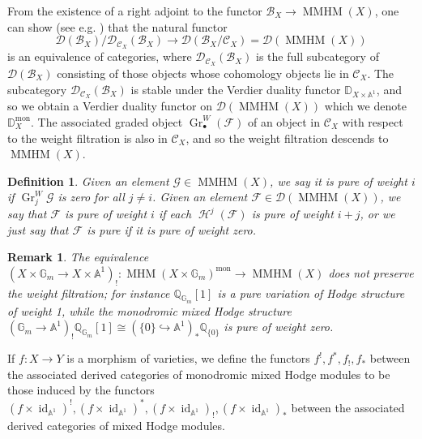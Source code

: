 \documentclass[a4paper,10pt]{amsart}
\newtheorem{definition}[theorem]{Definition}
\newtheorem{proposition}[theorem]{Proposition}
\newtheorem{remark}[theorem]{Remark}
\renewcommand{\AA}{\mathbb{A}}
\newcommand{\DD}{\mathbb{D}}
\newcommand{\GG}{\mathbb{G}}
\newcommand{\GrW}[1]{\Gr^W_{#1}}
\DeclareMathOperator{\Hom}{Hom}
\DeclareMathOperator{\mon}{mon}
\DeclareMathOperator{\MMHM}{MMHM}
\DeclareMathOperator{\Gr}{Gr}
\DeclareMathOperator{\MHM}{MHM}
\DeclareMathOperator{\id}{id}
\DeclareMathOperator{\Ho}{\mathcal{H}}
\newcommand{\Dub}{\mathcal{D}}
\begin{document}

From the existence of a right adjoint to the functor $\mathcal{B}_X\rightarrow \MMHM(X)$, one can show (see e.g. \cite[06XM]{Stackproject}) that the natural functor
\[
\Dub(\mathcal{B}_X)/\Dub_{\mathcal{C}_X}(\mathcal{B}_X)\rightarrow \Dub(\mathcal{B}_X/\mathcal{C}_X)=\Dub(\MMHM(X))
\]
is an equivalence of categories, where $\Dub_{\mathcal{C}_X}(\mathcal{B}_X)$ is the full subcategory of $\Dub(\mathcal{B}_X)$ consisting of those objects whose cohomology objects lie in $\mathcal{C}_X$.  The subcategory $\Dub_{\mathcal{C}_X}(\mathcal{B}_X)$ is stable under the Verdier duality functor $\DD_{X\times\AA^1}$, and so we obtain a Verdier duality functor on $\Dub(\MMHM(X))$ which we denote $\DD^{\mon}_X$.  The associated graded object $\GrW{\bullet}(\mathcal{F})$ of an object in $\mathcal{C}_X$ with respect to the weight filtration is also in $\mathcal{C}_X$, and so the weight filtration descends to $\MMHM(X)$.  
\begin{definition}
Given an element $\mathcal{G}\in\MMHM(X)$, we say it is pure of weight $i$ if $\GrW{j}\mathcal{G}$ is zero for all $j\neq i$.  Given an element $\mathcal{F}\in\Dub(\MMHM(X))$, we say that $\mathcal{F}$ is pure of weight $i$ if each $\Ho^j(\mathcal{F})$ is pure of weight $i+j$, or we just say that $\mathcal{F}$ is \textit{pure} if it is pure of weight zero.
\end{definition}
\begin{remark}
The equivalence $(X\times\GG_m\rightarrow X\times\AA^1)_!\colon \MHM(X\times\GG_m)^{\mon}\rightarrow\MMHM(X)$ does not preserve the weight filtration; for instance $\mathbb{Q}_{\mathbb{G}_m}[1]$ is a pure variation of Hodge structure of weight 1, while the monodromic mixed Hodge structure $(\mathbb{G}_m\rightarrow\mathbb{A}^1)_!\mathbb{Q}_{\mathbb{G}_m}[1]\cong(\{0\}\hookrightarrow \AA^1)_*\mathbb{Q}_{\{0\}} $ is pure of weight zero.
\end{remark}
If $f\colon X\rightarrow Y$ is a morphism of varieties, we define the functors $f^!,f^*,f_!,f_*$ between the associated derived categories of monodromic mixed Hodge modules to be those induced by the functors $(f\times\id_{\mathbb{A}^1})^!,(f\times\id_{\mathbb{A}^1})^*,(f\times\id_{\mathbb{A}^1})_!,(f\times\id_{\mathbb{A}^1})_*$ between the associated derived categories of mixed Hodge modules.  
\end{document}
